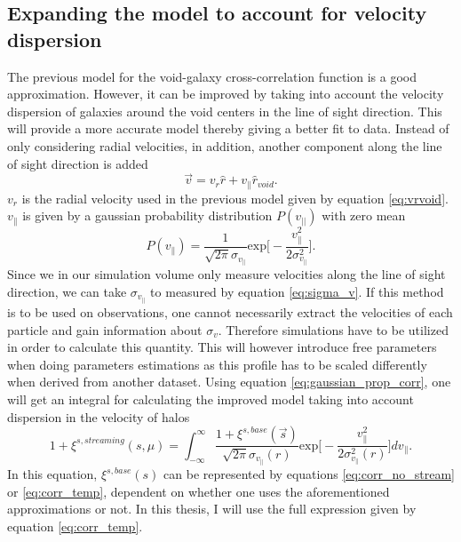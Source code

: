 \subsection{Expanding the model to account for velocity dispersion}
The previous model for the void-galaxy cross-correlation function is a good
approximation. However, it can be improved by taking into account the velocity
dispersion of galaxies around the void centers in the line of sight direction.
This will provide a more accurate model thereby giving a better fit to data.
Instead of only considering radial velocities, in addition, another component along the line
of sight direction is added
\begin{equation}
    \vec{v}=v_r\hat{r}+v_\parallel \hat{r}_{void}.
\end{equation}
$v_r$ is the radial velocity used in the previous model given by equation
\ref{eq:vrvoid}. $v_\parallel$ is given by a gaussian probability distribution
$P(v_{\vert\vert})$ with zero mean
\begin{equation}\label{eq:gaussian_prop_corr}
    P(v_\parallel)=\frac{1}{\sqrt{2\pi}\sigma_{v_{\parallel}}}\mathrm{exp}\Big[-\frac{v_\parallel^2}{2\sigma_{v_\parallel}^2}\Big].
\end{equation}
Since we in our simulation volume only measure velocities along the line of
sight direction, we can take $\sigma_{v_{\parallel}}$ to measured by equation
\ref{eq:sigma_v}. If this method is to be used on observations, one cannot necessarily extract the velocities of each particle and gain information about $\sigma_v$. Therefore simulations have to be utilized in order to calculate this quantity. This will however introduce free parameters when doing parameters estimations as this profile has to be scaled differently when derived from another dataset. Using equation \ref{eq:gaussian_prop_corr}, one will get an integral for calculating the improved
model taking into account dispersion in the velocity of halos \cite{BeyondBAO}
\begin{equation}\label{eq:corr_stream}
    1+\xi^{s,streaming}(s,\mu)=\int_{-\infty}^\infty\frac{1+\xi^{s,base}(\vec{s})}{\sqrt{2\pi}\sigma_{v_{\parallel}}(r)}\mathrm{exp}\Big[-\frac{v_\parallel^2}{2\sigma_{v_\parallel}^2 (r)}\Big]dv_\parallel.
\end{equation}
In this equation, $\xi^{s,base}(s)$ can be represented by equations \ref{eq:corr_no_stream} or \ref{eq:corr_temp}, dependent on whether one uses the aforementioned approximations or not. In this thesis, I will use the full expression given by equation \ref{eq:corr_temp}.
